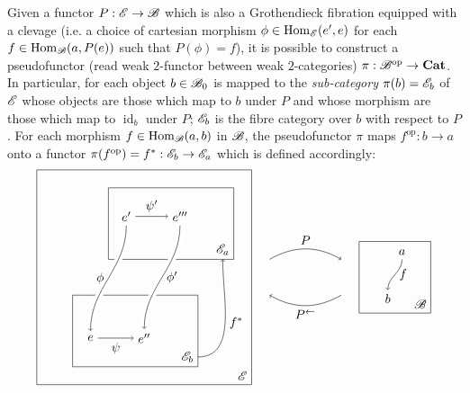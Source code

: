 \documentclass[12pt]{article}
\theoremstyle{definition}
\theoremstyle{remark}
\DeclareMathOperator{\id}{id}
\newcommand{\opcat}{\mathrm{op}}
\DeclareMathOperator{\Hom}{Hom}
\begin{document}
Given a functor $P : \mathscr{E} \to \mathscr{B}$ which is also a Grothendieck fibration equipped with a clevage (i.e. a choice of cartesian morphism $\phi \in \Hom_{\catE}(e', e)$ for each $f \in \Hom_{\catB}(a,P(e))$ such that $P(\phi) = f$), it is possible to construct a pseudofunctor (read weak $2$-functor between weak $2$-categories) $\pi : \catB^{\opcat} \to \mathbf{Cat}$. In particular, for each object $b \in \mathscr{B}_0$ is mapped to the \textit{sub-category} $\pi(b) = \mathscr{E}_b$ of $\mathscr{E}$ whose objects are those which map to $b$ under $P$ and whose morphism are those which map to $\id_{b}$ under $P$; $\mathscr{E}_b$ is the fibre category over $b$ with respect to $P$. For each morphism $f \in \Hom_{\catB}(a,b)$ in $\mathscr{B}$, the pseudofunctor $\pi$ maps $f^{\opcat} : b \to a$ onto a functor $\pi(f^{\opcat}) = f^{\ast} : \catE_{b} \to \catE_{a}$ which is defined accordingly:
\[
    \begin{tikzpicture}
        \begin{scope}[shift={(-4.5,0)}]
            \draw (-3,+3) rectangle (+3,-3) node[above left]{$\catE$};
            \begin{scope}[shift={(-1,+2.5)}]
                \draw (0,0) rectangle (+3.5,-2) node[above left](catEa){$\catE_a$};
                \draw (+0.5, -0.8) node(e2){$e'$};
                \draw (+2, -0.8) node(e4){$e'''$};
                \draw[->] (e2) to node[above]{$\psi'$} (e4);
            \end{scope}
            \begin{scope}[shift={(-2,-0.5)}]
                \draw (0,0) rectangle (+3.5,-2) node[above left](catEb){$\catE_b$};
                \draw (+0.5, -1.2) node(e1){$e$};
                \draw (+2, -1.2) node(e3){$e''$};
                \draw[->] (e1) to node[below]{$\psi$} (e3);
            \end{scope}
            \draw[white, line width=2mm] (e2) to[out=-90,in=+90] (e1);
            \draw[white, line width=2mm] (e4) to[out=-90,in=+90] (e3);
            \draw[->] (e2) to[out=-90,in=+90] node[left ]{$\phi$} (e1);
            \draw[->] (e4) to[out=-90,in=+90] node[right]{$\phi'$} (e3);
            \draw[->] (catEb) to[out=0,in=-90] node[right]{$f^{\ast}$} (catEa);
        \end{scope}
        \begin{scope}[shift={(+1.5,+1)}]
            \draw (0,0) rectangle (+2,-2) node[above left]{$\catB$};
            \draw (+1.2, -0.3) node(a){$a$};
            \draw (+0.8,-1.6) node(b){$b$};
            \draw[->] (a) to[out=-90,in=+90] node[right]{$f$} (b);
        \end{scope}
        \draw[->] (-1,+0.5) to[bend left ] node[above]{$P$} (+1, 0.5);
        \draw[<-] (-1,-0.5) to[bend right] node[below]{$P^{\leftarrow}$} (+1, -0.5);
    \end{tikzpicture}
\]
\end{document}
